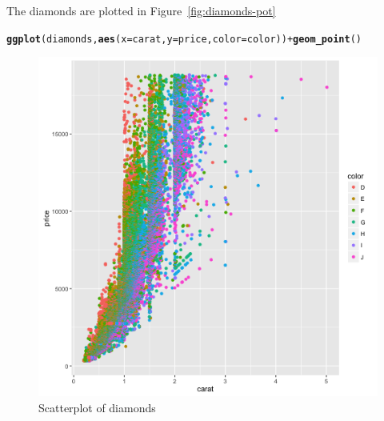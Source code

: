 \documentclass{article}\usepackage[]{graphicx}\usepackage[]{color}
\makeatletter
\newcommand{\hlopt}[1]{\textcolor[rgb]{0,0,0}{#1}}%
\newcommand{\hlstd}[1]{\textcolor[rgb]{0.345,0.345,0.345}{#1}}%
\newcommand{\hlkwc}[1]{\textcolor[rgb]{0.333,0.667,0.333}{#1}}%
\newcommand{\hlkwd}[1]{\textcolor[rgb]{0.737,0.353,0.396}{\textbf{#1}}}%
\newenvironment{kframe}{%
 \def\at@end@of@kframe{}%
 \ifinner\ifhmode%
  \def\at@end@of@kframe{\end{minipage}}%
  \begin{minipage}{\columnwidth}%
 \fi\fi%
 \def\FrameCommand##1{\hskip\@totalleftmargin \hskip-\fboxsep
 \colorbox{shadecolor}{##1}\hskip-\fboxsep
     \hskip-\linewidth \hskip-\@totalleftmargin \hskip\columnwidth}%
 \MakeFramed {\advance\hsize-\width
   \@totalleftmargin\z@ \linewidth\hsize
   \@setminipage}}%
 {\par\unskip\endMakeFramed%
 \at@end@of@kframe}
\newenvironment{knitrout}{}{} %
\makeatother
\begin{document}
The diamonds are plotted in Figure~\ref{fig:diamonds-pot}
\begin{knitrout}
\color{fgcolor}\begin{kframe}
\begin{alltt}
\hlkwd{ggplot}\hlstd{(diamonds,} \hlkwd{aes}\hlstd{(}\hlkwc{x}\hlstd{=carat,} \hlkwc{y}\hlstd{=price,} \hlkwc{color}\hlstd{=color))} \hlopt{+} \hlkwd{geom_point}\hlstd{()}
\end{alltt}
\end{kframe}\begin{figure}
\includegraphics[width=.95\linewidth]{figure/diamonds-plot-1} \caption[Scatterplot of diamonds]{Scatterplot of diamonds}\label{fig:diamonds-plot}
\end{figure}


\end{knitrout}
\end{document}
